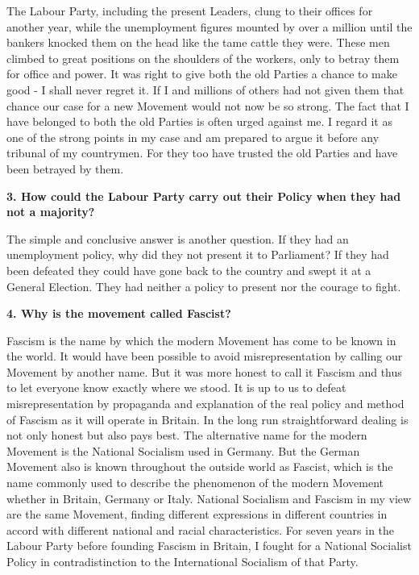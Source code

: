 \documentclass{book}
\begin{document}
\begin{flushleft}
The Labour Party, including the present Leaders, clung to their offices for another year, while the
unemployment figures mounted by over a million until the bankers knocked them on the head
like the tame cattle they were. These men climbed to great positions on the shoulders of the
workers, only to betray them for office and power. It was right to give both the old Parties a
chance to make good - I shall never regret it. If I and millions of others had not given them that
chance our case for a new Movement would not now be so strong. The fact that I have belonged
to both the old Parties is often urged against me. I regard it as one of the strong points in my case
and am prepared to argue it before any tribunal of my countrymen. For they too have trusted the old Parties and have been betrayed by them.
\end{flushleft}

\begin{flushright}
\textbf{3. How could the Labour Party carry out their Policy
    when they had not a majority?}

The simple and conclusive answer is another question. If they had an unemployment policy, why
did they not present it to Parliament? If they had been defeated they could have gone back to the
country and swept it at a General Election. They had neither a policy to present nor the courage to fight.
\end{flushright}

\begin{flushleft}
\textbf{4. Why is the movement called Fascist?}

Fascism is the name by which the modern Movement has come to be known in the world. It
would have been possible to avoid misrepresentation by calling our Movement by another name.
But it was more honest to call it Fascism and thus to let everyone know exactly where we stood.
It is up to us to defeat misrepresentation by propaganda and explanation of the real policy and
method of Fascism as it will operate in Britain. In the long run straightforward dealing is not
only honest but also pays best. The alternative name for the modern Movement is the National
Socialism used in Germany. But the German Movement also is known throughout the outside
world as Fascist, which is the name commonly used to describe the phenomenon of the modern
Movement whether in Britain, Germany or Italy. National Socialism and Fascism in my view are
the same Movement, finding different expressions in different countries in accord with different
national and racial characteristics. For seven years in the Labour Party before founding Fascism in Britain, I fought for a National
Socialist Policy in contradistinction to the International Socialism
of that Party.
\end{flushleft}
\end{document}
